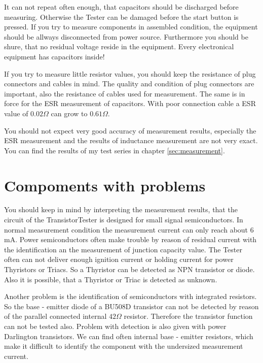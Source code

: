 It can not repeat often enough, that capacitors should be discharged before measuring.
Otherwise the Tester can be damaged before the start button is pressed.
If you try to measure components in assembled condition, the equipment should be allways disconnected from power source.
Furthermore you should be shure, that no residual voltage reside in the equipment.
Every electronical equipment has capacitors inside!

If you try to measure little resistor values, you should keep the resistance of plug connectors and cables in mind.
The quality and condition of plug connectors are important, also the resistance of cables used for measurement.
The same is in force for the ESR measurement of capacitors.
With poor connection cable a ESR value of \(0.02 \Omega\) can grow to \(0.61 \Omega\).

You should not expect very good accuracy of measurement results, especially the ESR measurement and the results of inductance measurement are not very exact.
You can find the results of my test series in chapter \ref{sec:measurement}.

\section{Compoments with problems}
You should keep in mind by interpreting the measurement results, that the circuit of the TransistorTester is
designed for small signal semiconductors. In normal measurement condition the measurement current can only reach about 6 mA.
Power semiconductors often make trouble by reason of residual current with the identification an the measurement of junction capacity value.
The Tester often can not deliver enough ignition current or holding current for power Thyristors or Triacs.
So a Thyristor can be detected as NPN transistor or diode. Also it is possible, that a Thyristor or Triac is detected as unknown.

Another problem is the identification of semiconductors with integrated resistors.
So the base - emitter diode of a BU508D transistor can not be detected by reason of the parallel connected
internal \(42 \Omega\) resistor.
Therefore the transistor function can not be tested also.
Problem with detection is also given with power Darlington transistors. We can find often internal
base - emitter resistors, which make it difficult to identify the component with the undersized measurement current.

